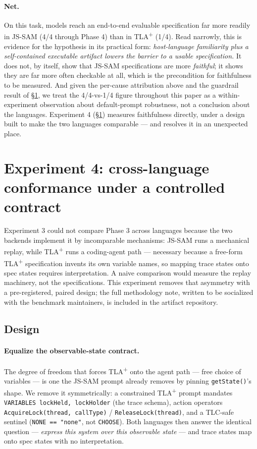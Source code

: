 \documentclass[11pt]{article}
\newcommand{\jssam}{JS-SAM}
\newcommand{\tlaplus}{TLA\texorpdfstring{\textsuperscript{+}}{+}}
\begin{document}
\paragraph{Net.}
On this task, models reach an end-to-end evaluable specification far more
readily in \jssam{} (4/4 through Phase 4) than in \tlaplus{} (1/4). Read
narrowly, this is evidence for the hypothesis in its practical form:
\emph{host-language familiarity plus a self-contained executable artifact
lowers the barrier to a usable specification.} It does not, by itself, show
that \jssam{} specifications are more \emph{faithful}; it shows they are
far more often checkable at all, which is the precondition for faithfulness
to be measured. And given the per-cause attribution above and the guardrail
result of \S\ref{sec:crosslang}, we treat the 4/4-vs-1/4 figure throughout
this paper as a within-experiment observation about default-prompt
robustness, not a conclusion about the languages. Experiment 4 (\S\ref{sec:crosslang})
measures faithfulness directly, under a design built to make the two
languages comparable --- and resolves it in an unexpected place.

\section{Experiment 4: cross-language conformance under a controlled contract}
\label{sec:crosslang}

Experiment 3 could not compare Phase 3 across languages because the two
backends implement it by incomparable mechanisms: \jssam{} runs a mechanical
replay, while \tlaplus{} runs a coding-agent path --- necessary because a
free-form \tlaplus{} specification invents its own variable names, so mapping
trace states onto spec states requires interpretation. A naive comparison
would measure the replay machinery, not the specifications. This experiment
removes that asymmetry with a pre-registered, paired design; the full
methodology note, written to be socialized with the benchmark maintainers, is
included in the artifact repository.

\subsection{Design}

\paragraph{Equalize the observable-state contract.}
The degree of freedom that forces \tlaplus{} onto the agent path --- free
choice of variables --- is one the \jssam{} prompt already removes by pinning
\texttt{getState()}'s shape. We remove it symmetrically: a constrained
\tlaplus{} prompt mandates \texttt{VARIABLES lockHeld, lockHolder} (the trace
schema), action operators \texttt{AcquireLock(thread, callType)} /
\texttt{ReleaseLock(thread)}, and a TLC-safe sentinel
(\texttt{NONE == "none"}, not \texttt{CHOOSE}). Both languages then answer
the identical question --- \emph{express this system over this observable
state} --- and trace states map onto spec states with no interpretation.
\end{document}
